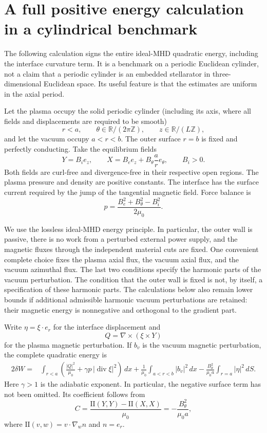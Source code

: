 \section{A full positive energy calculation in a cylindrical benchmark}

The following calculation signs the entire ideal-MHD quadratic energy,
including the interface curvature term.  It is a benchmark on a periodic
Euclidean cylinder, not a claim that a periodic cylinder is an embedded
stellarator in three-dimensional Euclidean space.  Its useful feature is
that the estimates are uniform in the axial period.

Let the plasma occupy the solid periodic cylinder (including its axis,
where all fields and displacements are required to be smooth)
\[
 r<a,\qquad \theta\in\mathbb R/(2\pi\mathbb Z),
 \qquad z\in\mathbb R/(L\mathbb Z),
\]
and let the vacuum occupy $a<r<b$.  The outer surface $r=b$ is fixed and
perfectly conducting.  Take the equilibrium fields
\[
 Y=B_i e_z,\qquad
 X=B_e e_z+B_\theta\frac{a}{r}e_\theta,
 \qquad B_i>0.
\]
Both fields are curl-free and divergence-free in their respective open
regions.  The plasma pressure and density are positive constants.  The
interface has the surface current required by the jump of the tangential
magnetic field.  Force balance is
\[
 p=\frac{B_e^2+B_\theta^2-B_i^2}{2\mu_0}.
\]

We use the lossless ideal-MHD energy principle.  In particular, the outer
wall is passive, there is no work from a perturbed external power supply,
and the magnetic fluxes through the independent material cuts are fixed.
One convenient complete choice fixes the plasma axial flux, the vacuum
axial flux, and the vacuum azimuthal flux.  The last two conditions specify
the harmonic parts of the vacuum perturbation.  The condition that the
outer wall is fixed is not, by itself, a specification of these harmonic
parts.  The calculations below also remain lower bounds if additional
admissible harmonic vacuum perturbations are retained: their magnetic
energy is nonnegative and orthogonal to the gradient part.

Write $\eta=\xi\cdot e_r$ for the interface displacement and
\[
 Q=\nabla\times(\xi\times Y)
\]
for the plasma magnetic perturbation.  If $b_v$ is the vacuum magnetic
perturbation, the complete quadratic energy is
\[
\begin{split}
2\delta W={}&
 \int_{r<a}\left(\frac{|Q|^2}{\mu_0}
       +\gamma p\,|\operatorname{div}\xi|^2\right)\,dx
 +\frac{1}{\mu_0}\int_{a<r<b}|b_v|^2\,dx
 -\frac{B_\theta^2}{\mu_0 a}\int_{r=a}|\eta|^2\,dS.
\end{split}
\]
Here $\gamma>1$ is the adiabatic exponent.  In particular, the negative
surface term has not been omitted.  Its coefficient follows from
\[
 C=\frac{\mathrm{II}(Y,Y)-\mathrm{II}(X,X)}{\mu_0}
   =-\frac{B_\theta^2}{\mu_0a},
\]
where $\mathrm{II}(v,w)=v\cdot\nabla_w n$ and $n=e_r$.

